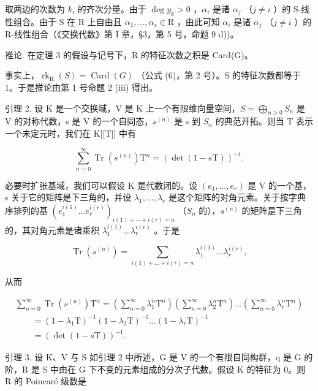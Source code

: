 取两边的次数为 \(k_i\) 的齐次分量。由于 \(\deg y_k > 0\) ，\(\alpha_i\) 是诸 \(\alpha_j\) （\(j \neq i\) ）的 S-线性组合。由于 S 在 R 上自由且 \(\alpha_1, \ldots, \alpha_s \in \mathrm{R}\) ，由此可知 \(\alpha_i\) 是诸 \(\alpha_j\) （\(j \neq i\) ）的 R-线性组合（《交换代数》第 I 章，§3，第 5 号，命题 9 d))。

推论. 在定理 3 的假设与记号下，R 的特征次数之积是 Card(G)。

事实上，\(\operatorname{rk}_{\mathrm{R}}(S) = \operatorname{Card}(G)\) （公式 (6)，第 2 号）。S 的特征次数都等于 1。于是推论由第 1 号命题 2 (iii) 得出。

引理 2. 设 K 是一个交换域，V 是 K 上一个有限维向量空间，\(S = \bigoplus_{n \geqslant 0} S_n\) 是 V 的对称代数，s 是 V 的一个自同态，\(s^{(n)}\) 是 s 到 \(S_n\) 的典范开拓。则当 T 表示一个未定元时，我们在 K{[}{[}T{]}{]} 中有

\[
\sum_ {n = 0} ^ {\infty} \operatorname{Tr} (s ^ {(n)}) \mathrm{T} ^ {n} = (\det (1 - s \mathrm{T})) ^ {- 1}.
\]

必要时扩张基域，我们可以假设 K 是代数闭的。设 \((e_{1},\ldots,e_{r})\) 是 V 的一个基，s 关于它的矩阵是下三角的，并设 \(\lambda_{1},\ldots,\lambda_{r}\) 是这个矩阵的对角元素。关于按字典序排列的基 \((e_{1}^{i(1)}\ldots e_{r}^{i(r)})_{i(1)+\cdots+i(r)=n}\) （\(S_{n}\) 的），\(s^{(n)}\) 的矩阵是下三角的，其对角元素是诸乘积 \(\lambda_{1}^{i(1)}\ldots\lambda_{r}^{i(r)}\) 。于是

\[
\operatorname{Tr} \left(s ^ {(n)}\right) = \sum_ {i (1) + \dots + i (r) = n} \lambda_ {1} ^ {i (1)} \dots \lambda_ {r} ^ {i (r)},
\]

从而

\[
\begin{array}{l} \sum_ {n = 0} ^ {\infty} \operatorname{Tr} (s ^ {(n)}) \mathrm{T} ^ {n} = \left(\sum_ {n = 0} ^ {\infty} \lambda_ {1} ^ {n} \mathrm{T} ^ {n}\right) \left(\sum_ {n = 0} ^ {\infty} \lambda_ {2} ^ {n} \mathrm{T} ^ {n}\right) \ldots \left(\sum_ {n = 0} ^ {\infty} \lambda_ {r} ^ {n} \mathrm{T} ^ {n}\right) \\ \qquad = (1 - \lambda_ {1} \mathrm{T}) ^ {- 1} (1 - \lambda_ {2} \mathrm{T}) ^ {- 1} \ldots (1 - \lambda_ {r} \mathrm{T}) ^ {- 1} \\ \qquad = (\det (1 - s \mathrm{T})) ^ {- 1}. \end{array}
\]

引理 3. 设 K、V 与 S 如引理 2 中所述，G 是 V 的一个有限自同构群，q 是 G 的阶，R 是 S 中由在 G 下不变的元素组成的分次子代数。假设 K 的特征为 0。则 R 的 Poincaré 级数是

